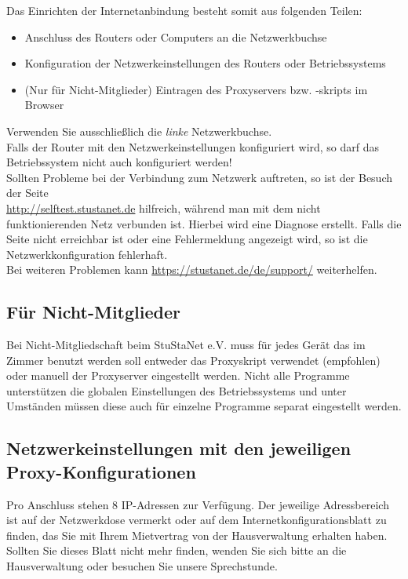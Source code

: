 \documentclass[a4paper,12pt]{scrartcl}
\begin{document}
Das Einrichten der Internetanbindung besteht somit aus folgenden Teilen:
\begin{itemize}
	\item Anschluss des Routers oder Computers an die Netzwerkbuchse
	\item Konfiguration der Netzwerkeinstellungen des Routers oder Betriebssystems
	\item (Nur für Nicht-Mitglieder) Eintragen des Proxyservers bzw. -skripts im Browser
\end{itemize}
Verwenden Sie ausschließlich die \emph{linke} Netzwerkbuchse.\\
Falls der Router mit den Netzwerkeinstellungen konfiguriert wird, so darf das Betriebssystem nicht auch konfiguriert werden!\\
Sollten Probleme bei der Verbindung zum Netzwerk auftreten, so ist der Besuch der Seite\\
\mbox{\url{http://selftest.stustanet.de}} hilfreich, während man mit dem nicht funktionierenden Netz verbunden ist. Hierbei wird eine Diagnose erstellt. Falls die Seite nicht erreichbar ist oder eine Fehlermeldung angezeigt wird, so ist die Netzwerkkonfiguration fehlerhaft.\\
Bei weiteren Problemen kann \mbox{\url{https://stustanet.de/de/support/}} weiterhelfen.

\subsection{Für Nicht-Mitglieder}

Bei Nicht-Mitgliedschaft beim StuStaNet e.V. muss für jedes Gerät das im Zimmer benutzt werden soll entweder das Proxyskript verwendet (empfohlen) oder manuell der Proxyserver eingestellt werden.
Nicht alle Programme unterstützen die globalen Einstellungen des Betriebssystems und unter Umständen müssen diese auch für einzelne Programme separat eingestellt werden.


\subsection{Netzwerkeinstellungen mit den jeweiligen Proxy-Konfigurationen}
\label{subsec_settings}

Pro Anschluss stehen 8 IP-Adressen zur Verfügung. Der jeweilige Adressbereich ist auf der Netzwerkdose vermerkt oder auf dem Internetkonfigurationsblatt zu finden, das Sie mit Ihrem Mietvertrag von der Hausverwaltung erhalten haben. Sollten Sie dieses Blatt nicht mehr finden, wenden Sie sich bitte an die Hausverwaltung oder besuchen Sie unsere Sprechstunde. %
\end{document}
